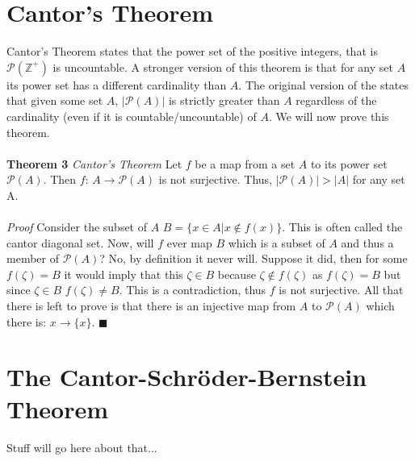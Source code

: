 \documentclass{article}
\begin{document}
\section{Cantor's Theorem}
\par Cantor's Theorem states that the power set of the positive integers, that is $\mathcal{P}(\mathbb{Z}^{+})$ is uncountable. A stronger version of this theorem is that for any set $A$ its power set has a different cardinality than $A$. The original version of the states that given some set $A$, $|\mathcal{P}(A)|$ is strictly greater than $A$ regardless of the cardinality (even if it is countable/uncountable) of $A$. We will now prove this theorem.
\\
\\
\textbf{Theorem 3} \textit{Cantor's Theorem} Let $f$ be a map from a set $A$ to its power set $\mathcal{P}(A)$. Then $f$: $A \to \mathcal{P}(A)$ is not surjective. Thus, $|\mathcal{P}(A)| > |A|$ for any set A. 
\\
\\
\textit{Proof} Consider the subset of $A$ $B=\{x \in A | x \not \in f(x)\}$. This is often called the cantor diagonal set. Now, will $f$ ever map $B$ which is a subset of $A$ and thus a member of $\mathcal{P}(A)$? No, by definition it never will. Suppose it did, then for some $f(\zeta)=B$ it would imply that this $\zeta \in B$ because $\zeta \not \in f(\zeta)$ as $f(\zeta)=B$ but since $\zeta \in B$ $f(\zeta) \not = B$. This is a contradiction, thus $f$ is not surjective. All that there is left to prove is that there is an injective map from $A$ to $\mathcal{P}(A)$ which there is: $x \to \{x\}$. $\blacksquare$
\section{The Cantor-Schr\"oder-Bernstein Theorem}
Stuff will go here about that...
\end{document}
